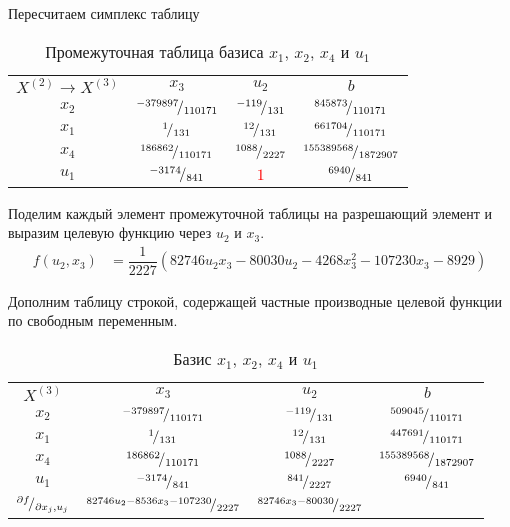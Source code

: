 Пересчитаем симплекс таблицу

\begin{table}[H]
\begin{center}
	\def\tabcolsep{17pt}
	\def\arraystretch{1.3}
	\caption{Промежуточная таблица базиса $x_1$, $x_2$, $x_4$ и $u_1$}
	\begin{tabular}{|c||c|c||c|}
		\hline
		$X^{(2)} \to X^{(3)}$ & $x_3$ & $u_2$ & $b$ \\ 
		\hhline{|=#==#=|}
		$x_2$ & ${}^{-379897}\!/_{110171}$ & ${}^{-119}\!/_{131}$ & ${}^{845873}\!/_{110171}$ \\ 
		\hline
		$x_1$ & ${}^{1}\!/_{131}$ & ${}^{12}\!/_{131}$ & ${}^{661704}\!/_{110171}$ \\ 
		\hline
		$x_4$ & ${}^{186862}\!/_{110171}$ & ${}^{1088}\!/_{2227}$ & ${}^{155389568}\!/_{1872907}$ \\ 
		\hline
		$u_1$ & ${}^{-3174}\!/_{841}$ & \textcolor{red}{\boldmath$1$} & ${}^{6940}\!/_{841}$ \\ 
		\hline
	\end{tabular}
\end{center}
\end{table}

Поделим каждый элемент промежуточной таблицы на разрешающий элемент и выразим целевую функцию через $u_2$ и $x_3$. 
\begin{align*}
	f(u_2, x_3) &= \dfrac{1}{2227} (82746 u_2 x_3 - 80030 u_2 - 4268 x_3^2 - 107230 x_3 - 8929)
\end{align*}

Дополним таблицу строкой, содержащей частные производные целевой функции по свободным переменным.
\vspace{-0.5cm}
\begin{table}[H]
\begin{center}
	\def\tabcolsep{10pt}
	\def\arraystretch{1.3}
	\caption{Базис $x_1$, $x_2$, $x_4$ и $u_1$}
	\begin{tabular}{|c||c|c||c|}
		\hline
		$X^{(3)}$ & $x_3$ & $u_2$ & $b$ \\ 
		\hhline{|=#==#=|}
		$x_2$ & ${}^{-379897}\!/_{110171}$ & ${}^{-119}\!/_{131}$ & ${}^{509045}\!/_{110171}$ \\ 
		\hline
		$x_1$ & ${}^{1}\!/_{131}$ & ${}^{12}\!/_{131}$ & ${}^{447691}\!/_{110171}$ \\ 
		\hline
		$x_4$ & ${}^{186862}\!/_{110171}$ & ${}^{1088}\!/_{2227}$ & ${}^{155389568}\!/_{1872907}$ \\ 
		\hline
		$u_1$ & ${}^{-3174}\!/_{841}$ & ${}^{841}\!/_{2227}$ & ${}^{6940}\!/_{841}$ \\ 
		\hhline{|=#==#=|}
		${}^{\partial f}\!/_{\partial x_j, u_j}$ & ${}^{82746 u_2 - 8536 x_3 - 107230}\!/_{2227}$ & ${}^{82746 x_3 - 80030}\!/_{2227} $ &  \\ 
		\hline
	\end{tabular}
\end{center}
\end{table}

